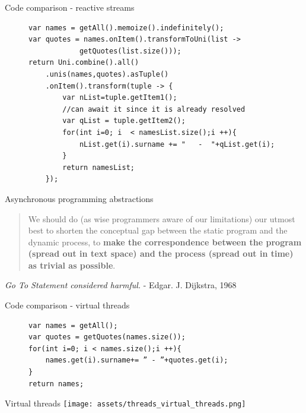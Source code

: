 \documentclass{beamer}
\begin{document}
\begin{frame}[fragile]{Code comparison - reactive streams}
    \begin{figure}
        \begin{lstlisting}
var names = getAll().memoize().indefinitely();
var quotes = names.onItem().transformToUni(list -> 
            getQuotes(list.size()));
return Uni.combine().all()
    .unis(names,quotes).asTuple()
    .onItem().transform(tuple -> {
        var nList=tuple.getItem1();
        //can await it since it is already resolved
        var qList = tuple.getItem2();
        for(int i=0; i  < namesList.size();i ++){
            nList.get(i).surname += "   -  "+qList.get(i);
        }
        return namesList;
    });
        \end{lstlisting}
    \end{figure}
\end{frame}
\begin{frame}{Asynchronous programming abstractions}
    \begin{quote}
        We should do (as wise programmers aware of our limitations) our utmost best to shorten the conceptual gap between the static program and the dynamic process, to \textbf{make the correspondence between the program (spread out in text space) and the process (spread out in time) as trivial as possible}.
    \end{quote}
    \emph{Go To Statement considered harmful.} - Edgar. J. Dijkstra, 1968
\end{frame}
\begin{frame}[fragile]{Code comparison - virtual threads}
    \begin{figure}
        \begin{lstlisting}
var names = getAll();
var quotes = getQuotes(names.size());
for(int i=0; i < names.size();i ++){
    names.get(i).surname+= ” - ”+quotes.get(i);
}
return names;
        \end{lstlisting}
    \end{figure}
\end{frame}
\begin{frame}{Virtual threads}
    \texttt{[image: assets/threads\_virtual\_threads.png]}
\end{frame}
\end{document}
